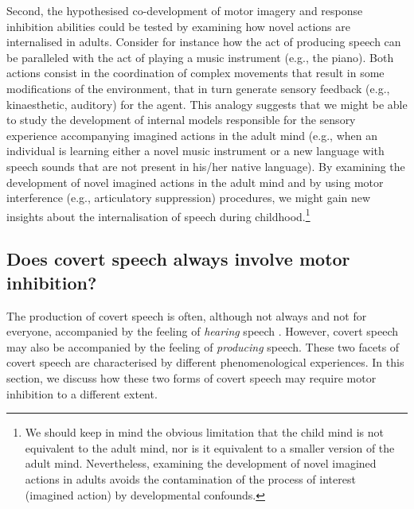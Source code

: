 \documentclass[utf8]{template/frontiersSCNS} %
\begin{document}
Second, the hypothesised co-development of motor imagery and response inhibition abilities could be tested by examining how novel actions are internalised in adults. Consider for instance how the act of producing speech can be paralleled with the act of playing a music instrument (e.g., the piano). Both actions consist in the coordination of complex movements that result in some modifications of the environment, that in turn generate sensory feedback (e.g., kinaesthetic, auditory) for the agent. This analogy suggests that we might be able to study the development of internal models responsible for the sensory experience accompanying imagined actions in the adult mind (e.g., when an individual is learning either a novel music instrument or a new language with speech sounds that are not present in his/her native language). By examining the development of novel imagined actions in the adult mind and by using motor interference (e.g., articulatory suppression) procedures, we might gain new insights about the internalisation of speech during childhood.\footnote{We should keep in mind the obvious limitation that the child mind is not equivalent to the adult mind, nor is it equivalent to a smaller version of the adult mind. Nevertheless, examining the development of novel imagined actions in adults avoids the contamination of the process of interest (imagined action) by developmental confounds.}

\subsection{Does covert speech always involve motor inhibition?}

The production of covert speech is often, although not always and not for everyone, accompanied by the feeling of \textit{hearing} speech \citep{hurlburt_investigating_2011}. However, covert speech may also be accompanied by the feeling of \textit{producing} speech. These two facets of covert speech are characterised by different phenomenological experiences. In this section, we discuss how these two forms of covert speech may require motor inhibition to a different extent.
\end{document}
